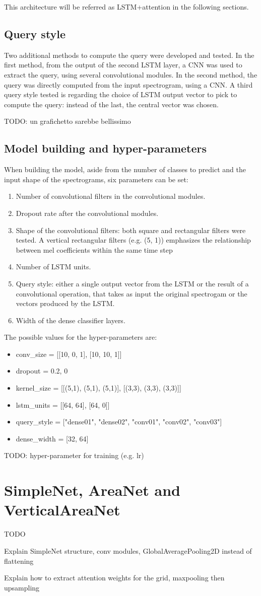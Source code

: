 This architecture will be referred as LSTM+attention in the following sections.

\subsection{Query style}

Two additional methods to compute the query were developed and tested.
In the first method, from the output of the second LSTM layer, a CNN was used
to extract the query, using several convolutional modules.
In the second method, the query was directly computed from the input
spectrogram, using a CNN.
A third query style tested is regarding the choice of LSTM output vector to
pick to compute the query: instead of the last, the central vector was chosen.

TODO: un grafichetto sarebbe bellissimo

\subsection{Model building and hyper-parameters}

When building the model, aside from the number of classes to predict and the
input shape of the spectrograms, six parameters can be set:
\begin{enumerate}
    \item Number of convolutional filters in the convolutional modules.
    \item Dropout rate after the convolutional modules.
    \item Shape of the convolutional filters:
        both square and rectangular filters were tested.
        A vertical rectangular filters (e.g. (5, 1)) emphasizes the
        relationship between mel coefficients within the same time step
    \item Number of LSTM units.
    \item Query style: either a single output vector from the LSTM or the
        result of a convolutional operation, that takes as input the original
        spectrogam or the vectors produced by the LSTM.
    \item Width of the dense classifier layers.
\end{enumerate}
The possible values for the hyper-parameters are:
\begin{itemize}
    \item conv\_size = [[10, 0, 1], [10, 10, 1]]
    \item dropout = {0.2, 0}
    \item kernel\_size = [[(5,1), (5,1), (5,1)], [(3,3), (3,3), (3,3)]]
    \item lstm\_units = [[64, 64], [64, 0]]
    \item query\_style = ["dense01", "dense02", "conv01", "conv02", "conv03"]
    \item dense\_width = [32, 64]
\end{itemize}

TODO: hyper-parameter for training (e.g. lr)

\section{SimpleNet, AreaNet and VerticalAreaNet}

TODO

Explain SimpleNet structure, conv modules, GlobalAveragePooling2D instead of
flattening

Explain how to extract attention weights for the grid, maxpooling then upsampling
